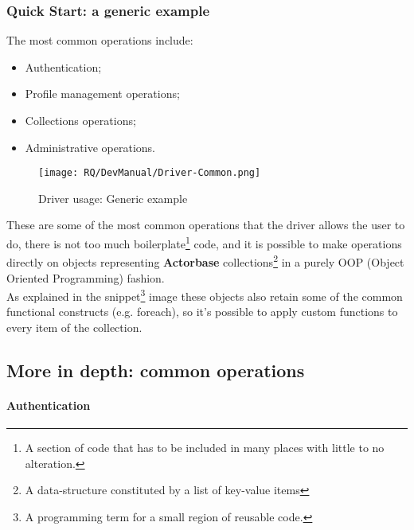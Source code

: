 \documentclass{scalatekids-article}
\begin{document}
\subsubsection{Quick Start: a generic example}

The most common operations include:
\begin{itemize}
\item Authentication;
\item Profile management operations;
\item Collections operations;
\item Administrative operations.
\end{itemize}

\begin{figure}[H]
  \begin{center}
    \texttt{[image: RQ/DevManual/Driver-Common.png]}
    \caption{Driver usage: Generic example}
  \end{center}
\end{figure}

These are some of the most common operations that the driver allows the user to do,
there is not too much boilerplate\footnote{A section of code that has to be
  included in many places with little to no alteration.} code, and it is possible
to make operations directly on objects representing \textbf{Actorbase}
collections\footnote{A data-structure constituted by a list of key-value items\label{coll}}
in a purely OOP (Object Oriented Programming) fashion.\\ As explained in
the snippet\footnote{A programming term for a small region of reusable code.}
image these objects also retain some of the common functional constructs (e.g.
foreach), so it's possible to apply custom functions to every item of the
collection.

\subsection{More in depth: common operations}

\paragraph{Authentication}
\end{document}
